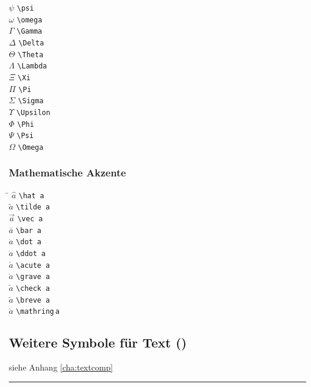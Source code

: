 \begin{multicols}{3}
\begin{tabbing}
$\psi$ 				\>		\lstinline|\psi| \\
$\omega$ 			\>		\lstinline|\omega|
\\[0.5\baselineskip]
$\Gamma$			\>		\lstinline|\Gamma| \\
$\Delta$			\>		\lstinline|\Delta| \\
$\Theta$			\>		\lstinline|\Theta| \\
$\Lambda$			\>		\lstinline|\Lambda| \\
$\Xi$					\>		\lstinline|\Xi| \\
$\Pi$					\>		\lstinline|\Pi| \\
$\Sigma$			\>		\lstinline|\Sigma| \\
$\Upsilon$		\>		\lstinline|\Upsilon| \\
$\Phi$				\>		\lstinline|\Phi| \\
$\Psi$				\>		\lstinline|\Psi| \\
$\Omega$			\>		\lstinline|\Omega| \\
\end{tabbing}
\end{multicols}

\noindent
\begin{minipage}{\linewidth}
	\subsubsection{Mathematische Akzente}

\begin{multicols}{3}
\negAbstand
	\begin{tabbing}
		\hspace{0.8em} \= \kill %
		 $\hat a$				\> \lstinline|\hat a| \\
		 $\tilde a$			\> \lstinline|\tilde a| \\
		 $\vec a$				\> \lstinline|\vec a| \\
		 $\bar a$				\> \lstinline|\bar a| \\
		 $\dot a$				\> \lstinline|\dot a	| \\
		 $\ddot a$			\> \lstinline|\ddot a| \\
		 $\acute a$			\> \lstinline|\acute a| \\
		 $\grave a$			\> \lstinline|\grave a| \\
		 $\check a$			\> \lstinline|\check a| \\
		 $\breve a$			\> \lstinline|\breve a| \\
		 $\mathring a$	\> \hspace{-0.5ex}%
			\lstinline|\mathring|\,\lstinline|a| \\
	\end{tabbing}
\end{multicols}

\end{minipage}

\subsection{Weitere Symbole für Text ()}
siehe Anhang \ref{cha:textcomp}
\hrule \vspace{0.5\baselineskip}
